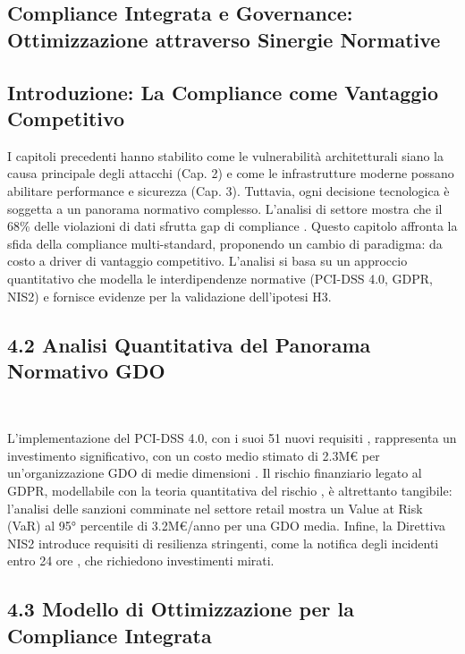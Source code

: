 \begin{refsection} %
\chapter{Compliance Integrata e Governance: Ottimizzazione attraverso Sinergie Normative}


\section{Introduzione: La Compliance come Vantaggio Competitivo}

I capitoli precedenti hanno stabilito come le vulnerabilità architetturali siano la causa principale degli attacchi (Cap. 2) e come le infrastrutture moderne possano abilitare performance e sicurezza (Cap. 3). Tuttavia, ogni decisione tecnologica è soggetta a un panorama normativo complesso. L'analisi di settore mostra che il 68\% delle violazioni di dati sfrutta gap di compliance \autocite{verizon2024}. Questo capitolo affronta la sfida della compliance multi-standard, proponendo un cambio di paradigma: da costo a driver di vantaggio competitivo. L'analisi si basa su un approccio quantitativo che modella le interdipendenze normative (PCI-DSS 4.0, GDPR, NIS2) e fornisce evidenze per la validazione dell'ipotesi H3.

\section{4.2 Analisi Quantitativa del Panorama Normativo GDO}\

L'implementazione del PCI-DSS 4.0, con i suoi 51 nuovi requisiti \autocite{pcidss2024}, rappresenta un investimento significativo, con un costo medio stimato di 2.3M€ per un'organizzazione GDO di medie dimensioni \autocite{Gartner2024}. Il rischio finanziario legato al GDPR, modellabile con la teoria quantitativa del rischio \autocite{mcneil2015}, è altrettanto tangibile: l'analisi delle sanzioni comminate nel settore retail \autocite{EDPB2024} mostra un Value at Risk (VaR) al 95° percentile di 3.2M€/anno per una GDO media. Infine, la Direttiva NIS2 introduce requisiti di resilienza stringenti, come la notifica degli incidenti entro 24 ore \autocite{ENISA2024nis2}, che richiedono investimenti mirati.

\section{4.3 Modello di Ottimizzazione per la Compliance Integrata}


\end{refsection}
